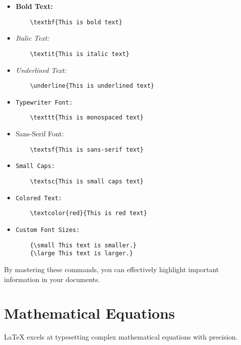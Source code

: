 \documentclass{article}
\begin{document}
\begin{itemize}
    \item \textbf{Bold Text:}
    \begin{verbatim}
    \textbf{This is bold text}
    \end{verbatim}
    
    \item \textit{Italic Text:}
    \begin{verbatim}
    \textit{This is italic text}
    \end{verbatim}
    
    \item \textit{Underlined Text:}
    \begin{verbatim}
    \underline{This is underlined text}
    \end{verbatim}
    
    \item \texttt{Typewriter Font:}
    \begin{verbatim}
    \texttt{This is monospaced text}
    \end{verbatim}
    
    \item \textsf{Sans-Serif Font:}
    \begin{verbatim}
    \textsf{This is sans-serif text}
    \end{verbatim}
    
    \item \texttt{Small Caps:}
    \begin{verbatim}
    \textsc{This is small caps text}
    \end{verbatim}
    
    \item \texttt{Colored Text:}
    \begin{verbatim}
    \textcolor{red}{This is red text}
    \end{verbatim}
    
    \item \texttt{Custom Font Sizes:}
    \begin{verbatim}
    {\small This text is smaller.}
    {\large This text is larger.}
    \end{verbatim}
\end{itemize}

By mastering these commands, you can effectively highlight important information in your documents.

\section{Mathematical Equations}
LaTeX{} excels at typesetting complex mathematical equations with precision. 
\end{document}
